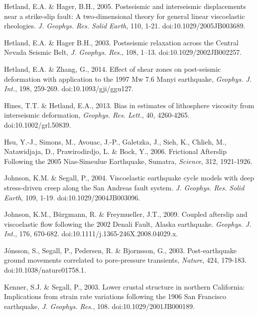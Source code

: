 \documentclass[extra,mreferee]{gji}
\begin{document}
\begin{thebibliography}{}
 Hetland, E.A. \& Hager,
  B.H., 2005. Postseismic and interseismic displacements near a
  strike-slip fault: A two-dimensional theory for general linear
  viscoelastic rheologies. \textit{J. Geophys. Res. Solid Earth}, 110,
  1-21. doi:10.1029/2005JB003689.

 Hetland, E.A. \& Hager B.H.,
  2003. Postseismic relaxation across the Central Nevada Seismic Belt,
  \textit{J. Geophys. Res.}, 108,
  1–13. doi:10.1029/2002JB002257.

 Hetland, E.A. \& Zhang, G.,
  2014. Effect of shear zones on post-seismic deformation with
  application to the 1997 Mw 7.6 Manyi earthquake, \textit{Geophys. J.
    Int.}, 198, 259-269. doi:10.1093/gji/ggu127.

 Hines, T.T. \&
  Hetland, E.A., 2013. Bias in estimates of lithosphere viscosity from
  interseismic deformation, \textit{Geophys. Res. Lett.}, 40,
  4260-4265. doi:10.1002/grl.50839.

 Hsu, Y.-J., Simons, M., Avouac,
  J.-P., Galetzka, J., Sieh, K., Chlieh, M., Natawidjaja, D.,
  Prawirodirdjo, L. \& Bock, Y., 2006. Frictional Afterslip Following
  the 2005 Nias-Simeulue Earthquake, Sumatra, \textit{Science}, 312,
  1921-1926.

 Johnson, K.M. \& Segall,
  P., 2004. Viscoelastic earthquake cycle models with deep
  stress-driven creep along the San Andreas fault
  system. \textit{J. Geophys.  Res. Solid Earth}, 109,
  1-19. doi:10.1029/2004JB003096.

Johnson, K.M.,
  B\"urgmann, R. \& Freymueller, J.T., 2009. Coupled afterslip and
  viscoelastic flow following the 2002 Denali Fault, Alaska
  earthquake. \textit{Geophys. J.  Int.}, 176,
  670-682. doi:10.1111/j.1365-246X.2008.04029.x.

 J\'onsson, S.,
  Segall, P., Pedersen, R. \& Bjornsson, G., 2003. Post-earthquake
  ground movements correlated to pore-pressure transients,
  \textit{Nature}, 424, 179-183. doi:10.1038/nature01758.1.

 Kenner, S.J. \& Segall, P.,
  2003. Lower crustal structure in northern California: Implications
  from strain rate variations following the 1906 San Francisco
  earthquake, \textit{J. Geophys. Res.},
  108. doi:10.1029/2001JB000189.


\end{thebibliography}
\end{document}
